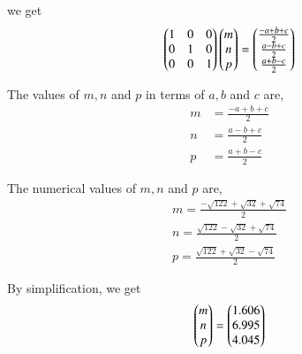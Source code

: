 \documentclass[journal,12pt,twocolumn]{IEEEtran}
\theoremstyle{remark}
\begin{document}
\vspace{0.3cm}
we get
\begin{align}
\begin{pmatrix}1&0&0\\0&1&0\\0&0&1\end{pmatrix}\begin{pmatrix}m\\n\\p\end{pmatrix} = \begin{pmatrix}\frac{-a+b+c}{2}\\\frac{a-b+c}{2}\\\frac{a+b-c}{2}\end{pmatrix}
\end{align}

\vspace{0.3cm}
The values of $m,n$ and $p$ in terms of $a,b$ and $c$ are,
\begin{align}
m &= \frac{-a+b+c}{2}\\
n &= \frac{a-b+c}{2}\\
p &= \frac{a+b-c}{2}
\end{align}

\vspace{0.3cm}
The numerical values of $m,n$ and $p$ are,
\begin{align}
m = \frac{-\sqrt{122}+\sqrt{32}+\sqrt{74}}{2}\\
n = \frac{\sqrt{122}-\sqrt{32}+\sqrt{74}}{2}\\
p = \frac{\sqrt{122}+\sqrt{32}-\sqrt{74}}{2}
\end{align}

\vspace{0.3cm}
By simplification, we get
\begin{align}
\begin{pmatrix}m\\n\\p\end{pmatrix} = \begin{pmatrix}1.606\\6.995\\4.045\end{pmatrix}
\end{align}


\newpage


\bigskip

\renewcommand{\thefigure}{\theenumi}
\renewcommand{\thetable}{\theenumi}

%
\end{document}
